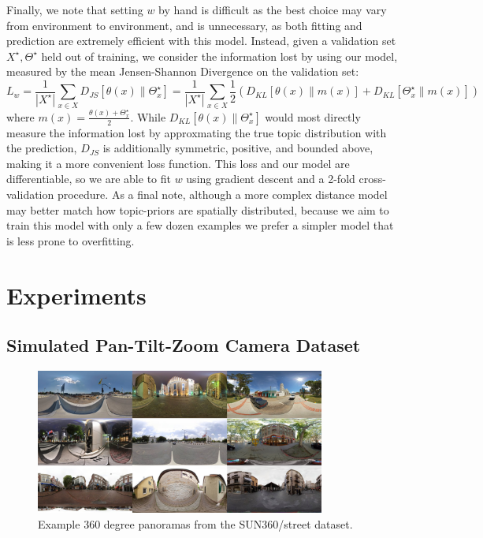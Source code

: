 Finally, we note that setting $w$ by hand is difficult as the best choice may vary from environment to environment, and is unnecessary, as both fitting and prediction are extremely efficient with this model. Instead, given a validation set $X^\star, \Theta^\star$ held out of training, we consider the information lost by using our model, measured by the mean Jensen-Shannon Divergence on the validation set:
\begin{equation}
L_w = \frac{1}{|X^\star|} \sum_{x \in X} D_{JS}\left[\theta(x) \| \Theta^\star_x \right]
 =  \frac{1}{|X^\star|} \sum_{x \in X} \frac{1}{2} \left(D_{KL}\left[\theta(x) \| m(x) \right] + D_{KL}\left[\Theta^\star_x \| m(x) \right]\right)
\end{equation}
where $m(x) = \frac{\theta(x)+\Theta^\star_x}{2}$. While $D_{KL}\left[\theta(x) \| \Theta^\star_x \right]$ would most directly measure the information lost by approxmating the true topic distribution with the prediction, $D_{JS}$ is additionally symmetric, positive, and bounded above, making it a more convenient loss function. This loss and our model are differentiable, so we are able to fit $w$ using gradient descent and a 2-fold cross-validation procedure. As a final note, although a more complex distance model may better match how topic-priors are spatially distributed, because we aim to train this model with only a few dozen examples we prefer a simpler model that is less prone to overfitting.

\section{Experiments}

\subsection{Simulated Pan-Tilt-Zoom Camera Dataset}
\begin{figure}
    \centering
    \includegraphics[width=0.85\textwidth]{figures/ptz/sun360_9x.jpg}
    \caption{Example 360 degree panoramas from the SUN360/street dataset.}
    \label{fig:sun360_ex}
\end{figure}

